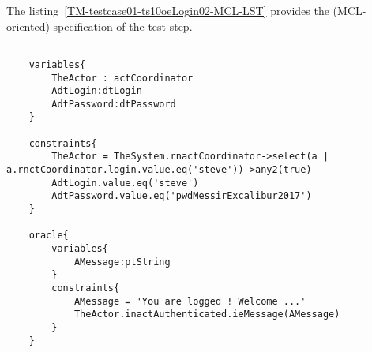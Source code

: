 	
	
		
	\vspace{1cm}
	The listing~\ref{TM-testcase01-ts10oeLogin02-MCL-LST} provides the \msrmessir (MCL-oriented) specification of the test step.
	
	\scriptsize
	\vspace{0.5cm}
	\begin{lstlisting}[style=MessirStyle,firstnumber=auto,captionpos=b,caption={\msrmessir (MCL-oriented) specification of the test step \emph{testcase01-ts10oeLogin02}.},label=TM-testcase01-ts10oeLogin02-MCL-LST]

	variables{
		TheActor : actCoordinator
		AdtLogin:dtLogin
		AdtPassword:dtPassword
	}
	
	constraints{
		TheActor = TheSystem.rnactCoordinator->select(a | a.rnctCoordinator.login.value.eq('steve'))->any2(true)
		AdtLogin.value.eq('steve')
		AdtPassword.value.eq('pwdMessirExcalibur2017')
	}
	
	oracle{
		variables{
			AMessage:ptString
		}
		constraints{
			AMessage = 'You are logged ! Welcome ...'
			TheActor.inactAuthenticated.ieMessage(AMessage)
		}
	}
	
	\end{lstlisting}
	\normalsize 
	
	
